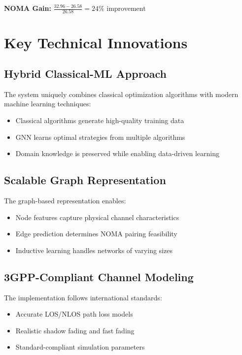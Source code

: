 \documentclass[11pt,a4paper]{article}
\begin{document}
\textbf{NOMA Gain:} $\frac{32.96 - 26.58}{26.58} = 24\%$ improvement

\section{Key Technical Innovations}

\subsection{Hybrid Classical-ML Approach}

The system uniquely combines classical optimization algorithms with modern machine learning techniques:

\begin{itemize}
    \item Classical algorithms generate high-quality training data
    \item GNN learns optimal strategies from multiple algorithms
    \item Domain knowledge is preserved while enabling data-driven learning
\end{itemize}

\subsection{Scalable Graph Representation}

The graph-based representation enables:

\begin{itemize}
    \item Node features capture physical channel characteristics
    \item Edge prediction determines NOMA pairing feasibility
    \item Inductive learning handles networks of varying sizes
\end{itemize}

\subsection{3GPP-Compliant Channel Modeling}

The implementation follows international standards:

\begin{itemize}
    \item Accurate LOS/NLOS path loss models
    \item Realistic shadow fading and fast fading
    \item Standard-compliant simulation parameters
\end{itemize}
\end{document}
